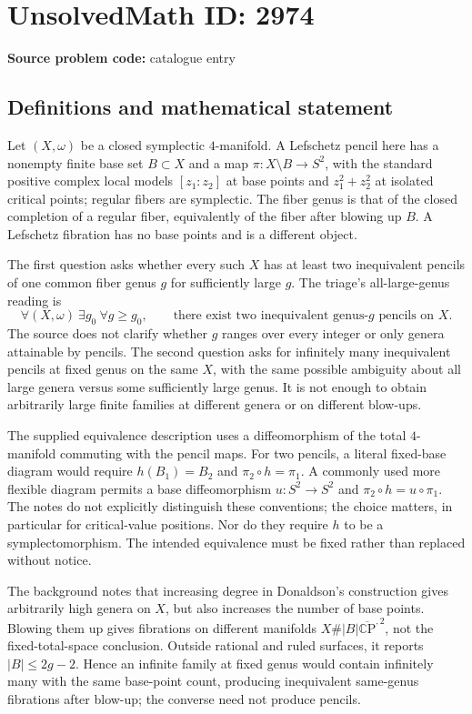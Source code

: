 \documentclass[11pt]{article}
\newcommand{\C}{\mathbb{C}}
\begin{document}
\section*{UnsolvedMath ID: 2974}
\textbf{Source problem code:} catalogue entry
\subsection{Definitions and mathematical statement}
Let $(X,\omega)$ be a closed symplectic $4$-manifold. A Lefschetz pencil here has a nonempty finite base set $B\subset X$ and a map $\pi:X\setminus B\to S^2$, with the standard positive complex local models $[z_1:z_2]$ at base points and $z_1^2+z_2^2$ at isolated critical points; regular fibers are symplectic. The fiber genus is that of the closed completion of a regular fiber, equivalently of the fiber after blowing up $B$. A Lefschetz fibration has no base points and is a different object.

The first question asks whether every such $X$ has at least two inequivalent pencils of one common fiber genus $g$ for sufficiently large $g$. The triage's all-large-genus reading is
\[
\forall(X,\omega)\ \exists g_0\ \forall g\geq g_0,\qquad
\text{there exist two inequivalent genus-}g\text{ pencils on }X.
\]
The source does not clarify whether $g$ ranges over every integer or only genera attainable by pencils. The second question asks for infinitely many inequivalent pencils at fixed genus on the same $X$, with the same possible ambiguity about all large genera versus some sufficiently large genus. It is not enough to obtain arbitrarily large finite families at different genera or on different blow-ups.

The supplied equivalence description uses a diffeomorphism of the total $4$-manifold commuting with the pencil maps. For two pencils, a literal fixed-base diagram would require $h(B_1)=B_2$ and $\pi_2\circ h=\pi_1$. A commonly used more flexible diagram permits a base diffeomorphism $u:S^2\to S^2$ and $\pi_2\circ h=u\circ\pi_1$. The notes do not explicitly distinguish these conventions; the choice matters, in particular for critical-value positions. Nor do they require $h$ to be a symplectomorphism. The intended equivalence must be fixed rather than replaced without notice.

The background notes that increasing degree in Donaldson's construction gives arbitrarily high genera on $X$, but also increases the number of base points. Blowing them up gives fibrations on different manifolds $X\#|B|\overline{\C\mathrm P}^{,2}$, not the fixed-total-space conclusion. Outside rational and ruled surfaces, it reports $|B|\leq2g-2$. Hence an infinite family at fixed genus would contain infinitely many with the same base-point count, producing inequivalent same-genus fibrations after blow-up; the converse need not produce pencils.
\end{document}
